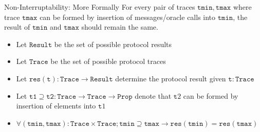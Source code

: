 
\begin{frame}{Non-Interruptability: More Formally}
    For every pair of traces $\mathtt{tmin}, \mathtt{tmax}$ where trace $\mathtt{tmax}$ can be formed by
    insertion of messages/oracle calls into $\mathtt{tmin}$, the result of $\mathtt{tmin}$ and $\mathtt{tmax}$
    should remain the same.

	

    \begin{itemize}
      \item Let $\mathtt{Result}$ be the set of possible protocol results
      \item Let $\mathtt{Trace}$ be the set of possible protocol traces
      \item Let $\mathtt{res}(\mathtt{t}) : \mathtt{Trace} \to \mathtt{Result}$ determine the protocol result given $\mathtt{t} : \mathtt{Trace}$
      \item Let $\mathtt{t1} \supseteq \mathtt{t2} : \mathtt{Trace} \to \mathtt{Trace} \to \mathtt{Prop}$ denote that $\mathtt{t}2$ can be formed by insertion of elements into $\mathtt{t}1$
      \item $\forall (\mathtt{tmin}, \mathtt{tmax}) : \mathtt{Trace} \times \mathtt{Trace}; \mathtt{tmin} \supseteq \mathtt{tmax} \to \mathtt{res}(\mathtt{tmin}) = \mathtt{res}(\mathtt{tmax})$
    \end{itemize}
\end{frame}



